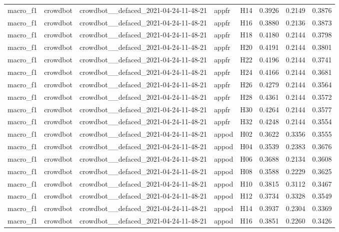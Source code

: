 \begin{table}[tbp]
\begin{tabular}{lllllrrr}
macro\_f1 & crowdbot & crowdbot\_\_defaced\_2021-04-24-11-48-21 & appfr & H14 & 0.3926 & 0.2149 & 0.3876 \\
macro\_f1 & crowdbot & crowdbot\_\_defaced\_2021-04-24-11-48-21 & appfr & H16 & 0.3880 & 0.2136 & 0.3873 \\
macro\_f1 & crowdbot & crowdbot\_\_defaced\_2021-04-24-11-48-21 & appfr & H18 & 0.4180 & 0.2144 & 0.3798 \\
macro\_f1 & crowdbot & crowdbot\_\_defaced\_2021-04-24-11-48-21 & appfr & H20 & 0.4191 & 0.2144 & 0.3801 \\
macro\_f1 & crowdbot & crowdbot\_\_defaced\_2021-04-24-11-48-21 & appfr & H22 & 0.4196 & 0.2144 & 0.3741 \\
macro\_f1 & crowdbot & crowdbot\_\_defaced\_2021-04-24-11-48-21 & appfr & H24 & 0.4166 & 0.2144 & 0.3681 \\
macro\_f1 & crowdbot & crowdbot\_\_defaced\_2021-04-24-11-48-21 & appfr & H26 & 0.4279 & 0.2144 & 0.3564 \\
macro\_f1 & crowdbot & crowdbot\_\_defaced\_2021-04-24-11-48-21 & appfr & H28 & 0.4361 & 0.2144 & 0.3572 \\
macro\_f1 & crowdbot & crowdbot\_\_defaced\_2021-04-24-11-48-21 & appfr & H30 & 0.4264 & 0.2144 & 0.3577 \\
macro\_f1 & crowdbot & crowdbot\_\_defaced\_2021-04-24-11-48-21 & appfr & H32 & 0.4248 & 0.2144 & 0.3554 \\
macro\_f1 & crowdbot & crowdbot\_\_defaced\_2021-04-24-11-48-21 & appod & H02 & 0.3622 & 0.3356 & 0.3555 \\
macro\_f1 & crowdbot & crowdbot\_\_defaced\_2021-04-24-11-48-21 & appod & H04 & 0.3539 & 0.2383 & 0.3676 \\
macro\_f1 & crowdbot & crowdbot\_\_defaced\_2021-04-24-11-48-21 & appod & H06 & 0.3688 & 0.2134 & 0.3608 \\
macro\_f1 & crowdbot & crowdbot\_\_defaced\_2021-04-24-11-48-21 & appod & H08 & 0.3588 & 0.2229 & 0.3625 \\
macro\_f1 & crowdbot & crowdbot\_\_defaced\_2021-04-24-11-48-21 & appod & H10 & 0.3815 & 0.3112 & 0.3467 \\
macro\_f1 & crowdbot & crowdbot\_\_defaced\_2021-04-24-11-48-21 & appod & H12 & 0.3734 & 0.3328 & 0.3549 \\
macro\_f1 & crowdbot & crowdbot\_\_defaced\_2021-04-24-11-48-21 & appod & H14 & 0.3937 & 0.2304 & 0.3369 \\
macro\_f1 & crowdbot & crowdbot\_\_defaced\_2021-04-24-11-48-21 & appod & H16 & 0.3851 & 0.2260 & 0.3426 \\

\end{tabular}
\end{table}
